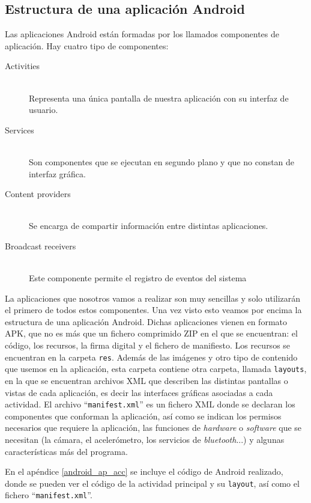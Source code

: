\documentclass[a4paper,openright, 12pt]{book}
\begin{document}
\subsection*{Estructura de una aplicación Android}
Las aplicaciones Android están formadas por los llamados componentes de aplicación. Hay cuatro tipo de componentes:
\begin{description}
  \item[Activities] \hfill \\
  Representa una única pantalla de nuestra aplicación con su interfaz de usuario.
  \item[Services] \hfill \\
  Son componentes que se ejecutan en segundo plano y que no constan de interfaz gráfica.
  \item[Content providers] \hfill \\
  Se encarga de compartir información entre distintas aplicaciones.
  \item[Broadcast receivers] \hfill \\
  Este componente permite el registro de eventos del sistema
\end{description}
La aplicaciones que nosotros vamos a realizar son muy sencillas y solo utilizarán el primero de todos estos componentes.
Una vez visto esto veamos por encima la estructura de una aplicación Android.
Dichas aplicaciones vienen en formato APK, que no es más que un fichero comprimido ZIP en el que se encuentran: el código, los recursos, la firma digital y el fichero de manifiesto.
\newline
Los recursos se encuentran en la carpeta \lstinline|res|. Además de las imágenes y otro tipo de contenido que usemos en la aplicación, esta carpeta contiene otra carpeta, llamada \lstinline|layouts|, en la que se encuentran archivos XML que describen las distintas pantallas o vistas de cada aplicación, es decir las interfaces gráficas asociadas a cada actividad.
\newline
El archivo ``\lstinline|manifest.xml|'' es un fichero XML donde se declaran los componentes que conforman la aplicación, así como se indican los permisos necesarios que requiere la aplicación, las funciones de \textit{hardware} o \textit{software} que se necesitan (la cámara, el acelerómetro, los servicios de \textit{bluetooth}...) y algunas características más del programa.

En el apéndice \ref{android_ap_acc} se incluye el código de Android realizado, donde se pueden ver el código de la actividad principal y su \lstinline|layout|, así como el fichero ``\lstinline|manifest.xml|''.
\end{document}

